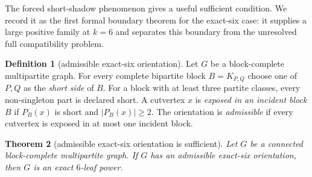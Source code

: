 \documentclass[11pt]{article}
\newtheorem{theorem}{Theorem}[section]
\theoremstyle{definition}
\newtheorem{definition}[theorem]{Definition}
\begin{document}
The forced short-shadow phenomenon gives a useful sufficient condition.  We record it as the first formal boundary theorem for the exact-six case: it supplies a large positive family at $k=6$ and separates this boundary from the unresolved full compatibility problem.

\begin{definition}[admissible exact-six orientation]\label{def:k6-admissible}
Let $G$ be a block-complete multipartite graph.  For every complete bipartite block $B=K_{P,Q}$ choose one of $P,Q$ as the \emph{short side} of $B$.  For a block with at least three partite classes, every non-singleton part is declared short.  A cutvertex $x$ is \emph{exposed in an incident block $B$} if $P_B(x)$ is short and $|P_B(x)|\ge2$.  The orientation is \emph{admissible} if every cutvertex is exposed in at most one incident block.
\end{definition}

\begin{theorem}[admissible exact-six orientation is sufficient]\label{thm:k6-sufficient}
Let $G$ be a connected block-complete multipartite graph.  If $G$ has an admissible exact-six orientation, then $G$ is an exact $6$-leaf power.
\end{theorem}
\end{document}
